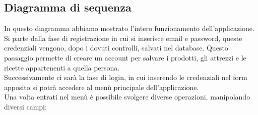 \documentclass[a4paper, titlepage]{article}
\begin{document}
\subsection{Diagramma di sequenza}
In questo diagramma abbiamo mostrato l'intero funzionamento dell'applicazione.\\
Si parte dalla fase di registrazione in cui si inserisce email e password, queste credenziali vengono, dopo i dovuti controlli, salvati nel database. Questo passaggio permette di creare un account per salvare i prodotti, gli attrezzi e le ricette appartenenti a quella persona.\\
Successivamente ci sarà la fase di login, in cui inserendo le credenziali nel form apposito si potrà accedere al menù principale dell'applicazione.\\
Una volta entrati nel menù è possibile svolgere diverse operazioni, manipolando diversi campi:
\end{document}
